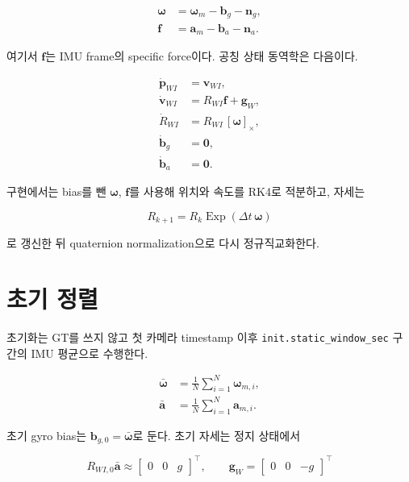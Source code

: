 \documentclass[11pt,a4paper,oneside]{report}
\begin{document}
\begin{align}
\boldsymbol{\omega}
&= \boldsymbol{\omega}_m - \mathbf{b}_g - \mathbf{n}_g, \\
\mathbf{f}
&= \mathbf{a}_m - \mathbf{b}_a - \mathbf{n}_a.
\end{align}

여기서 \(\mathbf{f}\)는 IMU frame의 specific force이다. 공칭 상태 동역학은 다음이다.

\begin{align}
\dot{\mathbf{p}}_{WI} &= \mathbf{v}_{WI}, \\
\dot{\mathbf{v}}_{WI} &= R_{WI}\mathbf{f} + \mathbf{g}_{W}, \\
\dot{R}_{WI} &= R_{WI}\,[\boldsymbol{\omega}]_{\times}, \\
\dot{\mathbf{b}}_g &= \mathbf{0}, \\
\dot{\mathbf{b}}_a &= \mathbf{0}.
\end{align}

구현에서는 bias를 뺀 \(\boldsymbol{\omega}\), \(\mathbf{f}\)를 사용해 위치와 속도를 RK4로
적분하고, 자세는

\begin{equation}
R_{k+1} = R_k\operatorname{Exp}(\Delta t\,\boldsymbol{\omega})
\end{equation}

로 갱신한 뒤 quaternion normalization으로 다시 정규직교화한다.

\section{초기 정렬}

초기화는 GT를 쓰지 않고 첫 카메라 timestamp 이후
\texttt{init.static\_window\_sec} 구간의 IMU 평균으로 수행한다.

\begin{align}
\bar{\boldsymbol{\omega}} &=
\frac{1}{N}\sum_{i=1}^{N}\boldsymbol{\omega}_{m,i}, \\
\bar{\mathbf{a}} &=
\frac{1}{N}\sum_{i=1}^{N}\mathbf{a}_{m,i}.
\end{align}

초기 gyro bias는 \(\mathbf{b}_{g,0}=\bar{\boldsymbol{\omega}}\)로 둔다.
초기 자세는 정지 상태에서

\begin{equation}
R_{WI,0}\bar{\mathbf{a}} \approx
\begin{bmatrix}0&0&g\end{bmatrix}^{\top},
\qquad
\mathbf{g}_{W} =
\begin{bmatrix}0&0&-g\end{bmatrix}^{\top}
\end{equation}
\end{document}
